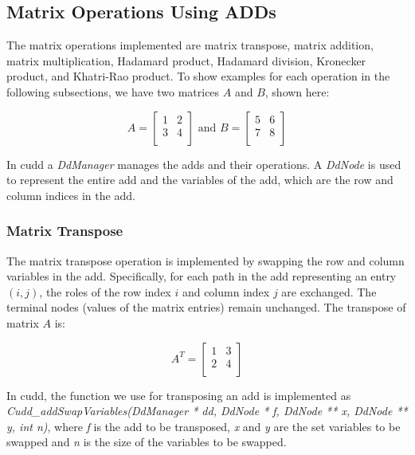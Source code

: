 
\subsection{Matrix Operations Using ADDs}\label{subsec:matrix-operations-using-adds}
The matrix operations implemented are matrix transpose, matrix addition, matrix multiplication, Hadamard product, Hadamard division, Kronecker product, and Khatri-Rao product.
To show examples for each operation in the following subsections, we have two matrices $A$ and $B$, shown here:

\[
    A = \begin{bmatrix}
            1 & 2 \\
            3 & 4 \\
    \end{bmatrix}
    \text{ and }
    B = \begin{bmatrix}
            5 & 6 \\
            7 & 8 \\
    \end{bmatrix}
\]

In \gls{cudd} a \textit{DdManager} manages the \glspl{add} and their operations.
A \textit{DdNode} is used to represent the entire \gls{add} and the variables of the \gls{add}, which are the row and column indices in the \gls{add}.

\subsubsection{Matrix Transpose}
The matrix transpose operation is implemented by swapping the row and column variables in the \gls{add}.
Specifically, for each path in the \gls{add} representing an entry $(i, j)$, the roles of the row index
$i$ and column index $j$ are exchanged.
The terminal nodes (values of the matrix entries) remain unchanged.
The transpose of matrix $A$ is:

\[
    A^T = \begin{bmatrix}
              1 & 3 \\
              2 & 4 \\
    \end{bmatrix}
\]

In \gls{cudd}, the function we use for transposing an \gls{add} is implemented as \textit{Cudd\_addSwapVariables(DdManager * dd, DdNode * f, DdNode ** x, DdNode ** y, int n)}, where \textit{f} is the \gls{add} to be transposed, \textit{x} and \textit{y} are the set variables to be swapped and \textit{n} is the size of the variables to be swapped.

